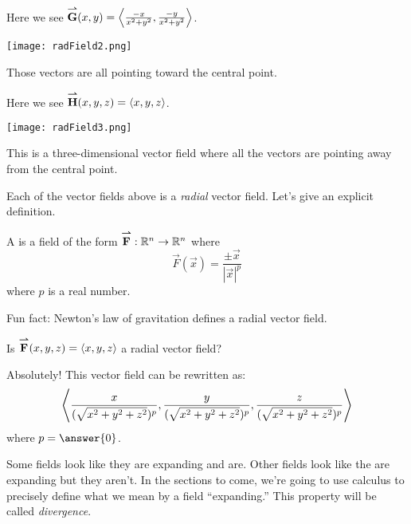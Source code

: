 \documentclass{ximera}
\begin{document}
\begin{example}
  Here we see ${\overset{\boldsymbol{\rightharpoonup}}{\mathbf{G}}}\hspace{0in}(x,y) =
  \left\langle \frac{-x}{x^2+y^2},\frac{-y}{x^2+y^2}\right\rangle$.
  \begin{image}
    \texttt{[image: radField2.png]}
  \end{image}
  Those vectors are all pointing toward the central point.
\end{example}

\begin{example}
  Here we see ${\overset{\boldsymbol{\rightharpoonup}}{\mathbf{H}}}\hspace{0in}(x,y,z) = \left\langle x,y,z\right\rangle$.
  \begin{image}
    \texttt{[image: radField3.png]}
  \end{image}
  This is a three-dimensional vector field where all the vectors are
  pointing away from the central point.
\end{example}

Each of the vector fields above is a \textit{radial} vector
field. Let's give an explicit definition.

\begin{definition}
  A  is a field of the form
  ${\overset{\boldsymbol{\rightharpoonup}}{\mathbf{F}}}\hspace{0in}:\mathbb R^n\to\mathbb R^n$ where
  \[
  \vec{F}(\vec{x}) = \frac{\pm\vec{x}}{|\vec{x}|^p}
  \]
  where $p$ is a real number.
\end{definition}

Fun fact: Newton's law of gravitation defines a radial vector field.


\begin{question}
  Is ${\overset{\boldsymbol{\rightharpoonup}}{\mathbf{F}}}\hspace{0in}(x,y,z) = \left\langle x,y,z\right\rangle$ a radial vector field?
  \begin{prompt}
    \begin{multipleChoice}
    \end{multipleChoice}
    \begin{feedback}[correct]
      Absolutely! This vector field can be rewritten as:
      \[
      \left\langle \frac{x}{(\sqrt{x^2+y^2+z^2})^p},\frac{y}{(\sqrt{x^2+y^2+z^2})^p},\frac{z}{(\sqrt{x^2+y^2+z^2})^p}\right\rangle
      \]
      where $p=\answer{0}$.
    \end{feedback}
  \end{prompt}
\end{question}

Some fields look like they are expanding and are. Other fields look
like the are expanding but they aren't. In the sections to come, we're
going to use calculus to precisely define what we mean by a field
``expanding.'' This property will be called \textit{divergence}.
\end{document}
